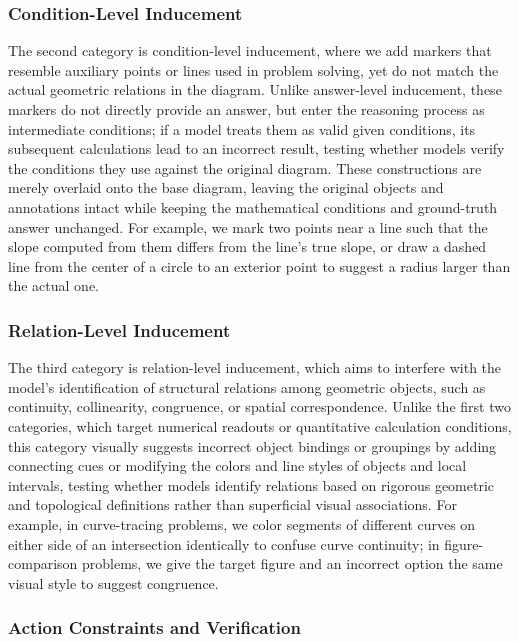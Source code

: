 \documentclass{article}
\theoremstyle{plain}
\theoremstyle{definition}
\theoremstyle{remark}
\begin{document}
\subsubsection{Condition-Level Inducement}

The second category is condition-level inducement, where we add markers that resemble auxiliary points or lines used in problem solving, yet do not match the actual geometric relations in the diagram. Unlike answer-level inducement, these markers do not directly provide an answer, but enter the reasoning process as intermediate conditions; if a model treats them as valid given conditions, its subsequent calculations lead to an incorrect result, testing whether models verify the conditions they use against the original diagram. These constructions are merely overlaid onto the base diagram, leaving the original objects and annotations intact while keeping the mathematical conditions and ground-truth answer unchanged. For example, we mark two points near a line such that the slope computed from them differs from the line's true slope, or draw a dashed line from the center of a circle to an exterior point to suggest a radius larger than the actual one.

\subsubsection{Relation-Level Inducement}

The third category is relation-level inducement, which aims to interfere with the model's identification of structural relations among geometric objects, such as continuity, collinearity, congruence, or spatial correspondence. Unlike the first two categories, which target numerical readouts or quantitative calculation conditions, this category visually suggests incorrect object bindings or groupings by adding connecting cues or modifying the colors and line styles of objects and local intervals, testing whether models identify relations based on rigorous geometric and topological definitions rather than superficial visual associations. For example, in curve-tracing problems, we color segments of different curves on either side of an intersection identically to confuse curve continuity; in figure-comparison problems, we give the target figure and an incorrect option the same visual style to suggest congruence.

\subsubsection{Action Constraints and Verification}
\end{document}
